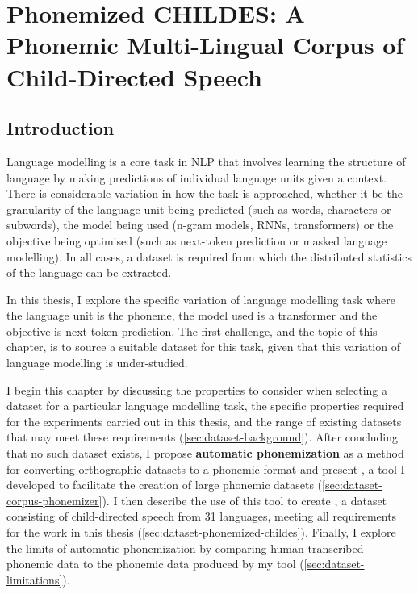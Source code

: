 \chapter{Phonemized CHILDES: A Phonemic Multi-Lingual Corpus of Child-Directed Speech}


\section{Introduction}
\label{sec:dataset-intro}

Language modelling is a core task in NLP that involves learning the structure of language by making predictions of individual language units given a context. There is considerable variation in how the task is approached, whether it be the granularity of the language unit being predicted (such as words, characters or subwords), the model being used (n-gram models, RNNs, transformers) or the objective being optimised (such as next-token prediction or masked language modelling). In all cases, a dataset is required from which the distributed statistics of the language can be extracted.

In this thesis, I explore the specific variation of language modelling task where the language unit is the phoneme, the model used is a transformer and the objective is next-token prediction. The first challenge, and the topic of this chapter, is to source a suitable dataset for this task, given that this variation of language modelling is under-studied.


I begin this chapter by discussing the properties to consider when selecting a dataset for a particular language modelling task, the specific properties required for the experiments carried out in this thesis, and the range of existing datasets that may meet these requirements (\cref{sec:dataset-background}). After concluding that no such dataset exists, I propose \textbf{automatic phonemization} as a method for converting orthographic datasets to a phonemic format and present \corpusphonemizer, a tool I developed to facilitate the creation of large phonemic datasets (\cref{sec:dataset-corpus-phonemizer}). I then describe the use of this tool to create \ipachildes, a dataset consisting of child-directed speech from 31 languages, meeting all requirements for the work in this thesis (\cref{sec:dataset-phonemized-childes}). Finally, I explore the limits of automatic phonemization by comparing human-transcribed phonemic data to the phonemic data produced by my tool (\cref{sec:dataset-limitations}).

